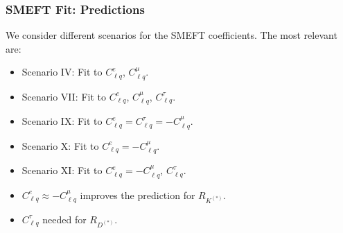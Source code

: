 \documentclass[mathserif, 10pt]{beamer}
\begin{document}
\begin{frame}\frametitle{SMEFT Fit: Predictions}

    We consider different scenarios for the SMEFT coefficients. The most relevant are:
    {\scriptsize \begin{itemize}
        \item Scenario IV: Fit to $C_{\ell q}^e$, $C_{\ell q}^\mu$.
        \item Scenario VII: Fit to $C_{\ell q}^e$, $C_{\ell q}^\mu$, $C_{\ell q}^\tau$.
        \item Scenario IX: Fit to $C_{\ell q}^e = C_{\ell q}^\tau = - C_{\ell q}^\mu$.
        \item Scenario X: Fit to $C_{\ell q}^e =  - C_{\ell q}^\mu$.
        \item Scenario XI: Fit to $C_{\ell q}^e = - C_{\ell q}^\mu$, $C_{\ell q}^\tau$.
    \end{itemize}}

    \begin{figure}\begin{center}
            \resizebox{0.52\textwidth}{!}{}
            \resizebox{0.37\textwidth}{!}{}

        \end{center}
    \end{figure}
    \begin{itemize}
        \item $C_{\ell q}^e \approx - C_{\ell q}^\mu$ improves the prediction for $R_{K^{(*)}}$.
        \item $C_{\ell q}^\tau$ needed for $R_{D^{(*)}}$.
    \end{itemize}

\end{frame}
\end{document}
